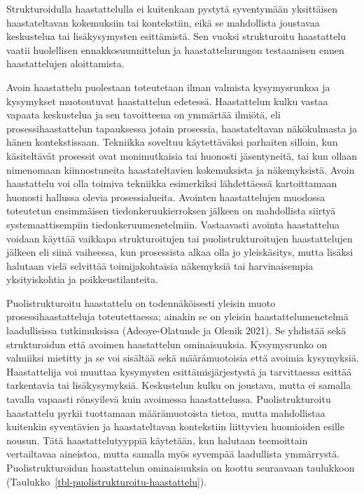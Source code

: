 \documentclass[
  finnish,
  letterpaper,
  DIV=11,
  numbers=noendperiod,
  oneside]{scrreprt}
\begin{document}
Strukturoidulla haastattelulla ei kuitenkaan pystytä syventymään
yksittäisen haastateltavan kokemuksiin tai kontekstiin, eikä se
mahdollista joustavaa keskustelua tai lisäkysymysten esittämistä. Sen
vuoksi strukturoitu haastattelu vaatii huolellisen ennakkosuunnittelun
ja haastattelurungon testaamisen ennen haastattelujen aloittamista.

Avoin haastattelu puolestaan toteutetaan ilman valmista kysymysrunkoa ja
kysymykset muotoutuvat haastattelun edetessä. Haastattelun kulku vastaa
vapaata keskustelua ja sen tavoitteena on ymmärtää ilmiötä, eli
prosessihaastattelun tapauksessa jotain prosessia, haastateltavan
näkökulmasta ja hänen kontekstissaan. Tekniikka soveltuu käytettäväksi
parhaiten silloin, kun käsiteltävät prosessit ovat monimutkaisia tai
huonosti jäsentyneitä, tai kun ollaan nimenomaan kiinnostuneita
haastateltavien kokemuksista ja näkemyksistä. Avoin haastattelu voi olla
toimiva tekniikka esimerkiksi lähdettäessä kartoittamaan huonosti
hallussa olevia prosessialueita. Avointen haastattelujen muodossa
toteutetun ensimmäisen tiedonkeruukierroksen jälkeen on mahdollista
siirtyä systemaattisempiin tiedonkeruumenetelmiin. Vastaavasti avointa
haastattelua voidaan käyttää vaikkapa strukturoitujen tai
puolistrukturoitujen haastattelujen jälkeen eli siinä vaiheessa, kun
prosessista alkaa olla jo yleiskäsitys, mutta lisäksi halutaan vielä
selvittää toimijakohtaisia näkemyksiä tai harvinaisempia yksityiskohtia
ja poikkeustilanteita.

Puolistrukturoitu haastattelu on todennäköisesti yleisin muoto
prosessihaastatteluja toteutettaessa; ainakin se on yleisin
haastattelumenetelmä laadullisissa tutkimuksissa (Adeoye-Olatunde ja
Olenik 2021). Se yhdistää sekä strukturoidun että avoimen haastattelun
ominaisuuksia. Kysymysrunko on valmiiksi mietitty ja se voi sisältää
sekä määrämuotoisia että avoimia kysymyksiä. Haastattelija voi muuttaa
kysymysten esittämisjärjestystä ja tarvittaessa esittää tarkentavia tai
lisäkysymyksiä. Keskustelun kulku on joustava, mutta ei samalla tavalla
vapaasti rönsyilevä kuin avoimessa haastattelussa. Puolistrukturoitu
haastattelu pyrkii tuottamaan määrämuotoista tietoa, mutta mahdollistaa
kuitenkin syventävien ja haastateltavan kontekstiin liittyvien
huomioiden esille nousun. Tätä haastattelutyyppiä käytetään, kun
halutaan teemoittain vertailtavaa aineistoa, mutta samalla myös syvempää
laadullista ymmärrystä. Puolistrukturoidun haastattelun ominaisuuksia on
koottu seuraavaan taulukkoon
(Taulukko~\ref{tbl-puolistrukturoitu-haastattelu}).
\end{document}
